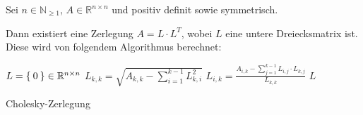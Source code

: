 \documentclass{article}
\begin{document}
\begin{preview}
    Sei $n \in \mathbb{N}_{\geq 1}$, $A \in \mathbb{R}^{n \times n}$ und
    positiv definit sowie symmetrisch.

    Dann existiert eine Zerlegung $A = L \cdot L^T$, wobei $L$ eine
    untere Dreiecksmatrix ist. Diese wird von folgendem Algorithmus
    berechnet:

    \begin{algorithm}[H]
        \begin{algorithmic}
                \State $L = \Set{0} \in \mathbb{R}^{n \times n}$ 
                    \State $L_{k,k} = \sqrt{A_{k,k} - \sum_{i=1}^{k-1} L_{k,i}^2}$
                        \State $L_{i,k} = \frac{A_{i,k} - \sum_{j=1}^{k-1} L_{i,j} \cdot L_{k,j}}{L_{k,k}}$
                    \EndFor
                \EndFor
                \State \Return $L$
            \EndFunction
        \end{algorithmic}
    \caption{Cholesky-Zerlegung}
    \label{alg:seq1}
    \end{algorithm}
\end{preview}
\end{document}
